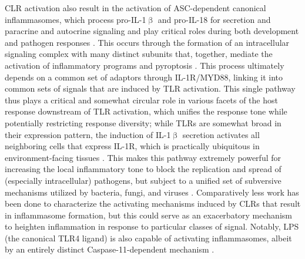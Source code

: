 CLR activation also result in the activation of ASC\hyp{}dependent canonical inflammasomes, which process pro\hyp{}IL\hyp{}1$\upbeta$ and pro\hyp{}IL\hyp{}18 for secretion and paracrine and autocrine signaling \citep{Gross2011} and play critical roles during both development and pathogen responses \citep{Tyrkalska2019}. This occurs through the formation of an intracellular signaling complex with many distinct subunits that, together, mediate the activation of inflammatory programs and pyroptosis \citep{Pandey2021}. This process ultimately depends on a common set of adaptors through IL\hyp{}1R/MYD88, linking it into common sets of signals that are induced by TLR activation. This single pathway thus plays a critical and somewhat circular role in various facets of the host response downstream of TLR activation, which unifies the response tone while potentially restricting response diversity; while TLRs are somewhat broad in their expression pattern, the induction of IL\hyp{}1$\upbeta$ secretion activates all neighboring cells that express IL\hyp{}1R, which is practically ubiquitous in environment\hyp{}facing tissues \citep{Deyerle1992, Malik2018}. This makes this pathway extremely powerful for increasing the local inflammatory tone to block the replication and spread of (especially intracellular) pathogens, but subject to a unified set of subversive mechanisms utilized by bacteria, fungi, and viruses \citep{Wein2022, MacMicking2012, Poeck2010, Tavares2015}. Comparatively less work has been done to characterize the activating mechanisms induced by CLRs that result in inflammasome formation, but this could serve as an exacerbatory mechanism to heighten inflammation in response to particular classes of signal. Notably, LPS (the canonical TLR4 ligand) is also capable of activating inflammasomes, albeit by an entirely distinct Caspase\hyp{}11\hyp{}dependent mechanism \citep{Hagar2013, Vanaja2016, Pilla2014, Finethy2020}.

